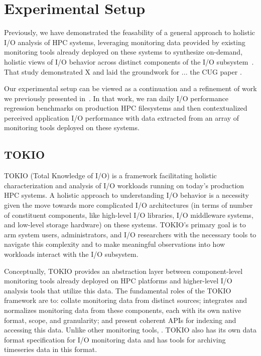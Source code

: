 \section{Experimental Setup}


Previously, we have demonstrated the feasability of a general approach to holistic I/O analysis of HPC systems, leveraging monitoring data provided by existing monitoring tools already deployed on these systems to synthesize on-demand, holistic views of I/O behavior across distinct components of the I/O subsystem~\cite{Lockwood2017}. That study demonstrated X and laid the groundwork for ... the CUG paper \cite{LockwoodCUG2018}.

Our experimental setup can be viewed as a continuation and a refinement of work we previously presented in~\cite{Lockwood2017}. In that work, we ran daily I/O performance regression benchmarks on production HPC filesystems and then contextualized perceived application I/O performance with data extracted from an array of monitoring tools deployed on these systems. 

\subsection{TOKIO}

TOKIO (Total Knowledge of I/O) is a framework facilitating holistic characterization and analysis of I/O workloads running on today's production HPC systems. A holistic approach to understanding I/O behavior is a necessity given the move towards more complicated I/O architectures (in terms of number of constituent components, like high-level I/O libraries, I/O middleware systems, and low-level storage hardware) on these systems. TOKIO's primary goal is to arm system users, administrators, and I/O researchers with the necessary tools to navigate this complexity and to make meaningful observations into how workloads interact with the I/O subsystem.

Conceptually, TOKIO provides an abstraction layer between component-level monitoring tools already deployed on HPC platforms and higher-level I/O analysis tools that utilize this data. The fundamental roles of the TOKIO framework are to: collate monitoring data from distinct sources; integrates and normalizes monitoring data from these components, each with its own native format, scope, and granularity; and present coherent APIs for indexing and accessing this data. Unlike other monitoring tools, .
TOKIO also has its own data format specification for I/O monitoring data and has tools for archiving timeseries data in this format.

